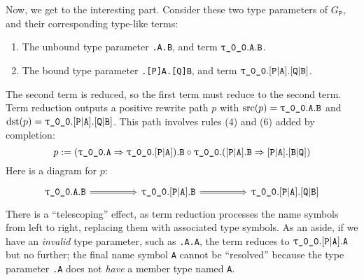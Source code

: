 \documentclass[../generics]{subfiles}
\begin{document}
\begin{example}
Now, we get to the interesting part. Consider these two type parameters of $G_\texttt{P}$, and their corresponding type-like terms:
\begin{enumerate}
\item The unbound type parameter \texttt{.A.B}, and term $\texttt{$\uptau$\_0\_0}.\texttt{A}.\texttt{B}$.
\item The bound type parameter \texttt{.[P]A.[Q]B}, and term $\texttt{$\uptau$\_0\_0}.[\texttt{P}|\texttt{A}].[\texttt{Q}|\texttt{B}]$.
\end{enumerate}
The second term is reduced, so the first term must reduce to the second term. Term reduction outputs a positive rewrite path $p$ with $\operatorname{src}(p)=\texttt{$\uptau$\_0\_0}.\texttt{A}.\texttt{B}$ and $\operatorname{dst}(p)=\texttt{$\uptau$\_0\_0}.[\texttt{P}|\texttt{A}].[\texttt{Q}|\texttt{B}]$. This path involves rules (4) and (6) added by completion:
\[
p := (\texttt{$\uptau$\_0\_0}.\texttt{A}\Rightarrow\texttt{$\uptau$\_0\_0}.[\texttt{P}|\texttt{A}]).\texttt{B} \circ \texttt{$\uptau$\_0\_0}.([\texttt{P}|\texttt{A}].\texttt{B}\Rightarrow[\texttt{P}|\texttt{A}].[\texttt{B}|\texttt{Q}])
\]
Here is a diagram for $p$:
\[
\begin{tikzcd}[column sep=huge]
\ttgp{0}{0}.\texttt{A}.\texttt{B}\arrow[r, Rightarrow]&
\ttgp{0}{0}.\assocsym{P}{A}.\texttt{B}\arrow[r, Rightarrow]&
\ttgp{0}{0}.\assocsym{P}{A}.\assocsym{Q}{B}
\end{tikzcd}
\]
There is a ``telescoping'' effect, as term reduction processes the name symbols from left to right, replacing them with associated type symbols. As an aside, if we have an \emph{invalid} type parameter, such as \texttt{.A.A}, the term reduces to $\texttt{$\uptau$\_0\_0}.[\texttt{P}|\texttt{A}].\texttt{A}$ but no further; the final name symbol \texttt{A} cannot be ``resolved'' because the type parameter \texttt{.A} does not \emph{have} a member type named \texttt{A}.


\end{example}
\end{document}
